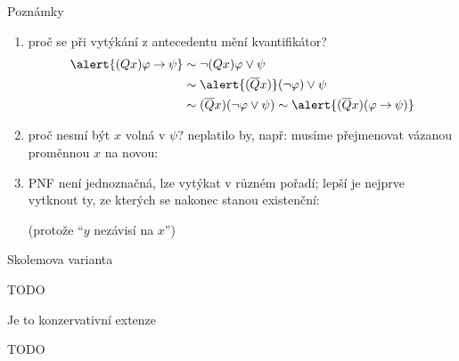 \documentclass{beamer}
\begin{document}
\begin{frame}{Poznámky}

    \begin{enumerate}
        \item proč se při vytýkání z \alert{antecedentu} mění kvantifikátor?
        \begin{align*}
            \alert{(Qx)\varphi \limplies \psi}&\sim\neg(Qx)\varphi \lor\psi\\&\sim\alert{(\overline{Q}x)}(\neg\varphi)\lor\psi\\
            &\sim(\overline{Q}x)(\neg\varphi\lor\psi)\sim \alert{(\overline{Q}x)(\varphi \limplies \psi)}    
        \end{align*}

        \medskip
    
        \item proč nesmí být $x$ volná v $\psi$? neplatilo by, např:
        musíme přejmenovat vázanou proměnnou $x$ na novou: 
        

        \medskip

        \item PNF není jednoznačná, lze vytýkat v různém pořadí; lepší je nejprve vytknout ty, \alert{ze kterých se nakonec stanou existenční:}
        
        \medskip

        
        \medskip

        (protože ``$y$ nezávisí na $x$'')
    \end{enumerate}

\end{frame}


\begin{frame}{Skolemova varianta}

   TODO

\end{frame}


\begin{frame}{Je to konzervativní extenze}

   TODO 

\end{frame}
\end{document}
